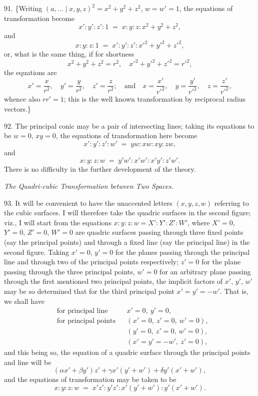 \documentclass[11pt]{article}
\begin{document}
91. \{Writing $(a,\ldots\mid x,y,z)^2 = x^2 + y^2 + z^2$, $w = w' = 1$, the equations of transformation become
\[ x':y':z':1 \;=\; x : y : z : x^2 + y^2 + z^2, \]
and
\[ x:y:z:1 \;=\; x':y':z':x'^2 + y'^2 + z'^2, \]
or, what is the same thing, if for shortness
\[ x^2 + y^2 + z^2 = r^2, \quad x'^2 + y'^2 + z'^2 = r'^2, \]
the equations are
\[ x' = \frac{x}{r^2}, \quad y' = \frac{y}{r^2}, \quad z' = \frac{z}{r^2}; \quad \text{and} \quad x = \frac{x'}{r'^2}, \quad y = \frac{y'}{r'^2}, \quad z = \frac{z'}{r'^2}, \]
whence also $r r' = 1$; this is the well known transformation by reciprocal radius vectors.\}

92. The principal conic may be a pair of intersecting lines; taking its equations
to be $w=0$, $xy=0$, the equations of transformation here become
\[ x':y':z':w' \;=\; yw : xw : xy : zw, \]
and
\[ x:y:z:w \;=\; y'w' : x'w' : x'y' : z'w'. \]
There is no difficulty in the further development of the theory.

\medskip
\begin{center}\textit{The Quadri-cubic Transformation between Two Spaces.}\end{center}

93. It will be convenient to have the unaccented letters $(x,y,z,w)$ referring to
the cubic surfaces. I will therefore take the quadric surfaces in the second figure;
viz., I will start from the equations $x:y:z:w = X':Y':Z':W'$, where $X'=0$,
$Y'=0$, $Z'=0$, $W'=0$ are quadric surfaces passing through three fixed points (say the
principal points) and through a fixed line (say the principal line) in the second figure.
Taking $x'=0$, $y'=0$ for the planes passing through the principal line and through
two of the principal points respectively; $z'=0$ for the plane passing through the
three principal points, $w'=0$ for an arbitrary plane passing through the first mentioned
two principal points, the implicit factors of $x'$, $y'$, $w'$ may be so determined that for
the third principal point $x' = y' = -w'$. That is, we shall have
\begin{align*}
&\text{for principal line} && x'=0,\ y'=0,\\
&\text{for principal points} && (x'=0,\ z'=0,\ w'=0),\\
& && (y'=0,\ z'=0,\ w'=0),\\
& && (x'=y'=-w',\ z'=0),
\end{align*}
and this being so, the equation of a quadric surface through the principal points and
line will be
\[ (\alpha x' + \beta y') z' + \gamma x'(y' + w') + \delta y'(x' + w'), \]
and the equations of transformation may be taken to be
\[ x:y:z:w \;=\; x'z' : y'z' : x'(y' + w') : y'(x' + w'). \]
\end{document}
